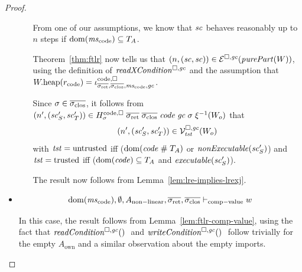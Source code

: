 \documentclass[a4paper]{article}
\begin{document}
\begin{proof}
\begin{itemize}
\begin{itemize}

      From one of our assumptions, we know that $\vsc$ behaves reasonably up to $n$ steps if $\dom(\mscode)\subseteq \ta$.

      Theorem~\ref{thm:ftlr} now tells us that $\npair{(\vsc,\vsc)} \in \lre(\purePart{W})$, using the definition of $\xReadCond{}$ and the assumption that $\pwheap(r_{\mathrm{code}}) = \codereg{\sigrets,\sigcloss,\mscode,\gc}$.

      Since $\sigma\in\sigcloss$, it follows from $\npair[n']{(\vsc_S',\vsc'_T)} \in H^\mathrm{code,\square}_\sigma \; \sigrets \; \sigcloss \; \code \; \gc \; \sigma \; \xi^{-1}(W_o)$ that
      \begin{equation*}
        \npair[n']{(\vsc_S',\vsc'_T)} \in \lrvg{\trust}(W_o)
      \end{equation*}
      with $\trust = \untrusted$ iff ($\dom(\code \mathrel{\#} \ta)$ or $\nonExec{\vsc_S'}$) and $\trust = \trusted$ iff ($\dom(\code) \subseteq \ta$ and $\exec{\vsc_S'}$).

      The result now follows from Lemma~\ref{lem:lre-implies-lrexj}.
    \end{itemize}

  \item
    \begin{equation*}
      \dom(\mscode),\emptyset,A_{\mathrm{non-linear}},\sigrets,\sigcloss \vdash_{\mathrm{comp-value}} w
    \end{equation*}

    In this case, the result follows from Lemma~\ref{lem:ftlr-comp-value}, using the fact that $\readCond$ and $\writeCond$ follow trivially for the empty $A_{\mathrm{own}}$ and a similar observation about the empty imports.
  \end{itemize}
\end{proof}
\end{document}
